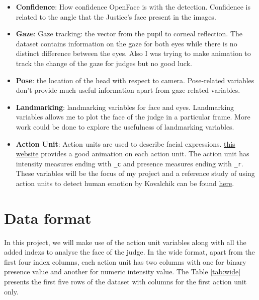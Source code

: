 \documentclass{monashthesis}
\begin{document}
\begin{itemize}
\item
  \textbf{Confidence}: How confidence OpenFace is with the detection. Confidence is related to the angle that the Justice's face present in the images.
\item
  \textbf{Gaze}: Gaze tracking: the vector from the pupil to corneal reflection. The dataset contains information on the gaze for both eyes while there is no distinct difference between the eyes. Also I was trying to make animation to track the change of the gaze for judges but no good luck.
\item
  \textbf{Pose}: the location of the head with respect to camera. Pose-related variables don't provide much useful information apart from gaze-related variables.
\item
  \textbf{Landmarking}: landmarking variables for face and eyes. Landmarking variables allows me to plot the face of the judge in a particular frame. More work could be done to explore the usefulness of landmarking variables.
\item
  \textbf{Action Unit}: Action units are used to describe facial expressions. \href{https://imotions.com/blog/facial-action-coding-system/}{this website} provides a good animation on each action unit. The action unit has intensity measures ending with \texttt{\_c} and presence measures ending with \texttt{\_r}. These variables will be the focus of my project and a reference study of using action units to detect human emotion by Kovalchik can be found \href{http://www.sloansportsconference.com/wp-content/uploads/2018/02/2005.pdf}{here}.
\end{itemize}

\hypertarget{data-format}{%
\section{Data format}\label{data-format}}

In this project, we will make use of the action unit variables along with all the added indexs to analyse the face of the judge. In the wide format, apart from the first four index columns, each action unit has two columns with one for binary presence value and another for numeric intensity value. The Table \ref{tab:wide} presents the first five rows of the dataset with columns for the first action unit only.
\end{document}
